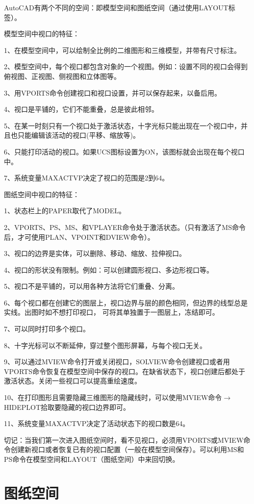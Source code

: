 AutoCAD有两个不同的空间：即模型空间和图纸空间（通过使用LAYOUT标签）。
 
模型空间中视口的特征：

1、在模型空间中，可以绘制全比例的二维图形和三维模型，并带有尺寸标注。

2、模型空间中，每个视口都包含对象的一个视图。例如：设置不同的视口会得到俯视图、正视图、侧视图和立体图等。

3、用VPORTS命令创建视口和视口设置，并可以保存起来，以备后用。

4、视口是平铺的，它们不能重叠，总是彼此相邻。

5、在某一时刻只有一个视口处于激活状态，十字光标只能出现在一个视口中，并且也只能编辑该活动的视口(平移、缩放等)。

6、只能打印活动的视口。如果UCS图标设置为ON，该图标就会出现在每个视口中。

7、系统变量MAXACTVP决定了视口的范围是2到64。

图纸空间中视口的特征：

1、状态栏上的PAPER取代了MODEL。

2、VPORTS、PS、MS、和VPLAYER命令处于激活状态。（只有激活了MS命令后，才可使用PLAN、VPOINT和DVIEW命令）。

3、视口的边界是实体，可以删除、移动、缩放、拉伸视口。

4、视口的形状没有限制。例如：可以创建圆形视口、多边形视口等。

5、视口不是平铺的，可以用各种方法将它们重叠、分离。

6、每个视口都在创建它的图层上，视口边界与层的颜色相同，但边界的线型总是实线。出图时如不想打印视口， 可将其单独置于一图层上，冻结即可。

7、可以同时打印多个视口。

8、十字光标可以不断延伸，穿过整个图形屏幕，与每个视口无关。

9、可以通过MVIEW命令打开或关闭视口，SOLVIEW命令创建视口或者用VPORTS命令恢复在模型空间中保存的视口。在缺省状态下，视口创建后都处于激活状态。关闭一些视口可以提高重绘速度。

10、在打印图形且需要隐藏三维图形的隐藏线时，可以使用MVIEW命令$\to$HIDEPLOT拾取要隐藏的视口边界即可。

11、系统变量MAXACTVP决定了活动状态下的视口数是64。

切记：当我们第一次进入图纸空间时，看不见视口，必须用VPORTS或MVIEW命令创建新视口或者恢复已有的视口配置（一般在模型空间保存）。可以利用MS和PS命令在模型空间和LAYOUT（图纸空间）中来回切换。 


\chapter{图纸空间}

